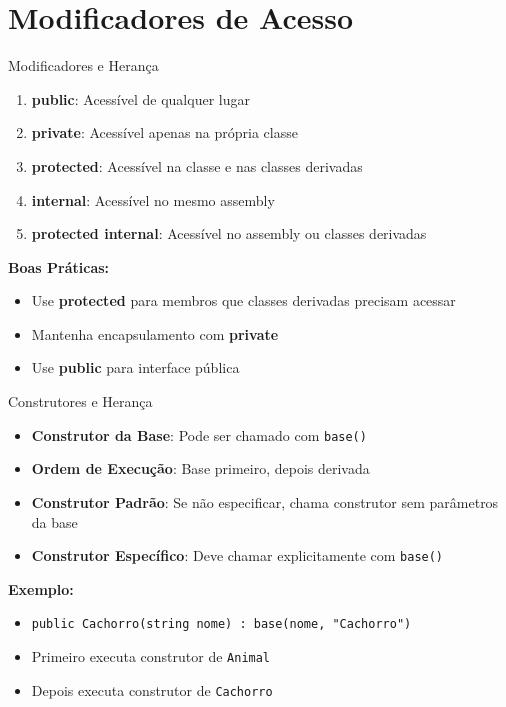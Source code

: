 \documentclass[aspectratio=169]{beamer}
\begin{document}
\section{Modificadores de Acesso}

\begin{frame}{Modificadores e Herança}
\begin{enumerate}
\item \textbf{public}: Acessível de qualquer lugar
\item \textbf{private}: Acessível apenas na própria classe
\item \textbf{protected}: Acessível na classe e nas classes derivadas
\item \textbf{internal}: Acessível no mesmo assembly
\item \textbf{protected internal}: Acessível no assembly ou classes derivadas
\end{enumerate}

\vspace{0.5cm}
\textbf{Boas Práticas:}
\begin{itemize}
\item Use \textbf{protected} para membros que classes derivadas precisam acessar
\item Mantenha encapsulamento com \textbf{private}
\item Use \textbf{public} para interface pública
\end{itemize}
\end{frame}

\begin{frame}{Construtores e Herança}
\begin{itemize}
\item \textbf{Construtor da Base}: Pode ser chamado com \texttt{base()}
\item \textbf{Ordem de Execução}: Base primeiro, depois derivada
\item \textbf{Construtor Padrão}: Se não especificar, chama construtor sem parâmetros da base
\item \textbf{Construtor Específico}: Deve chamar explicitamente com \texttt{base()}
\end{itemize}

\vspace{0.3cm}
\textbf{Exemplo:}
\begin{itemize}
\item \texttt{public Cachorro(string nome) : base(nome, "Cachorro")}
\item Primeiro executa construtor de \texttt{Animal}
\item Depois executa construtor de \texttt{Cachorro}
\end{itemize}
\end{frame}
\end{document}
